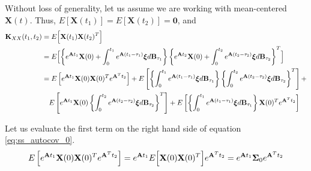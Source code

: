 \documentclass{article}
\begin{document}
Without loss of generality, let us assume we are working with mean-centered $\mathbf{X}(t)$. Thus, $E[\mathbf{X}(t_{1})]=E[\mathbf{X}(t_{2})]=\mathbf{0}$, and
\begin{equation}
\begin{aligned}
\mathbf{K}_{XX}(t_1, t_2) &=E\Bigl [\mathbf{X}(t_{1})\mathbf{X}(t_{2})^T \Bigr] \\
&=E\Bigl[\left \{e^{\mathbf{A}t_{1}}\mathbf{X}(0)+\int_0^{t_{1}} e^{\mathbf{A}(t_{1}-\tau_1)} \boldsymbol{\xi} d\mathbf{B}_{\tau_1} \right \} \left \{ e^{\mathbf{A}t_{2}}\mathbf{X}(0)+\int_0^{t_{2}} e^{\mathbf{A}(t_{2}-\tau_2)} \boldsymbol{\xi} d\mathbf{B}_{\tau_2} \right \}^T \Bigr] \\
&= E \left[ e^{\mathbf{A}t_{1}} \mathbf{X}(0) \mathbf{X}(0)^T e^{\mathbf{A}^T t_{2}} \right]  +  E \left [ \left \{ \int_0^{t_{1}} e^{\mathbf{A}(t_{1}-\tau_1)} \boldsymbol{\xi} d\mathbf{B}_{\tau_1} \right \}  \left \{ \int_0^{t_{2}} e^{\mathbf{A}(t_{2}-\tau_2)} \boldsymbol{\xi} d\mathbf{B}_{\tau_2} \right \}^T \right ] +\\
& \quad E \left[ e^{\mathbf{A}t_{1}} \mathbf{X}(0) \left \{ \int_0^{t_{2}} e^{\mathbf{A}(t_{2}-\tau_2)} \boldsymbol{\xi} d\mathbf{B}_{\tau_2} \right \}^T \right] + E \left [ \left \{ \int_0^{t_{1}} e^{\mathbf{A}(t_{1}-\tau_1)} \boldsymbol{\xi} d\mathbf{B}_{\tau_1} \right \} \mathbf{X}(0)^T e^{\mathbf{A}^T t_{2}} \right ]
\end{aligned}
\label{eq:ss_autocov_0}
\end{equation}

Let us evaluate the first term on the right hand side of equation \ref{eq:ss_autocov_0}.
\begin{equation}
\begin{aligned}
 E \left[ e^{\mathbf{A}t_{1}} \mathbf{X}(0) \mathbf{X}(0)^T e^{\mathbf{A}^T t_{2}} \right]=
  e^{\mathbf{A}t_{1}}  E\Bigl[\mathbf{X}(0) \mathbf{X}(0)^T \Bigr] e^{\mathbf{A}^T t_{2}} = e^{\mathbf{A}t_{1}} \mathbf{\Sigma}_0 e^{\mathbf{A}^T t_{2}}
\end{aligned}
\label{eq:ss_autocov_1st_term}
\end{equation}
\end{document}
